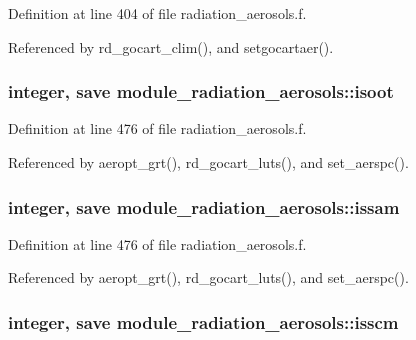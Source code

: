 Definition at line 404 of file radiation\+\_\+aerosols.\+f.



Referenced by rd\+\_\+gocart\+\_\+clim(), and setgocartaer().

\subsubsection[{\texorpdfstring{isoot}{isoot}}]{\setlength{\rightskip}{0pt plus 5cm}integer, save module\+\_\+radiation\+\_\+aerosols\+::isoot\hspace{0.3cm}{\ttfamily [private]}}\hypertarget{namespacemodule__radiation__aerosols_aa9aa876f65d1e1e971607bff4ffbddad}{}\label{namespacemodule__radiation__aerosols_aa9aa876f65d1e1e971607bff4ffbddad}


Definition at line 476 of file radiation\+\_\+aerosols.\+f.



Referenced by aeropt\+\_\+grt(), rd\+\_\+gocart\+\_\+luts(), and set\+\_\+aerspc().

\subsubsection[{\texorpdfstring{issam}{issam}}]{\setlength{\rightskip}{0pt plus 5cm}integer, save module\+\_\+radiation\+\_\+aerosols\+::issam\hspace{0.3cm}{\ttfamily [private]}}\hypertarget{namespacemodule__radiation__aerosols_ab64435256571a80bbb577fc4f27b39ee}{}\label{namespacemodule__radiation__aerosols_ab64435256571a80bbb577fc4f27b39ee}


Definition at line 476 of file radiation\+\_\+aerosols.\+f.



Referenced by aeropt\+\_\+grt(), rd\+\_\+gocart\+\_\+luts(), and set\+\_\+aerspc().

\subsubsection[{\texorpdfstring{isscm}{isscm}}]{\setlength{\rightskip}{0pt plus 5cm}integer, save module\+\_\+radiation\+\_\+aerosols\+::isscm\hspace{0.3cm}{\ttfamily [private]}}\hypertarget{namespacemodule__radiation__aerosols_a762cff73e22fefab8adf68d08d5c4df1}{}\label{namespacemodule__radiation__aerosols_a762cff73e22fefab8adf68d08d5c4df1}



